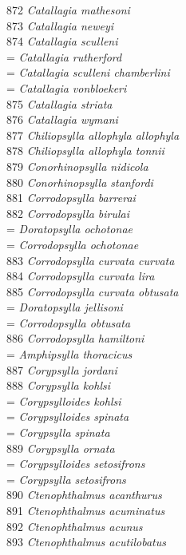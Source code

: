 \documentclass[
]{article}
\begin{document}
872 \emph{Catallagia mathesoni}\\
873 \emph{Catallagia neweyi}\\
874 \emph{Catallagia sculleni}\\
= \emph{Catallagia rutherford}\\
= \emph{Catallagia sculleni chamberlini}\\
= \emph{Catallagia vonbloekeri}\\
875 \emph{Catallagia striata}\\
876 \emph{Catallagia wymani}\\
877 \emph{Chiliopsylla allophyla allophyla}\\
878 \emph{Chiliopsylla allophyla tonnii}\\
879 \emph{Conorhinopsylla nidicola}\\
880 \emph{Conorhinopsylla stanfordi}\\
881 \emph{Corrodopsylla barrerai}\\
882 \emph{Corrodopsylla birulai}\\
= \emph{Doratopsylla ochotonae}\\
= \emph{Corrodopsylla ochotonae}\\
883 \emph{Corrodopsylla curvata curvata}\\
884 \emph{Corrodopsylla curvata lira}\\
885 \emph{Corrodopsylla curvata obtusata}\\
= \emph{Doratopsylla jellisoni}\\
= \emph{Corrodopsylla obtusata}\\
886 \emph{Corrodopsylla hamiltoni}\\
= \emph{Amphipsylla thoracicus}\\
887 \emph{Corypsylla jordani}\\
888 \emph{Corypsylla kohlsi}\\
= \emph{Corypsylloides kohlsi}\\
= \emph{Corypsylloides spinata}\\
= \emph{Corypsylla spinata}\\
889 \emph{Corypsylla ornata}\\
= \emph{Corypsylloides setosifrons}\\
= \emph{Corypsylla setosifrons}\\
890 \emph{Ctenophthalmus acanthurus}\\
891 \emph{Ctenophthalmus acuminatus}\\
892 \emph{Ctenophthalmus acunus}\\
893 \emph{Ctenophthalmus acutilobatus}\\
\end{document}
